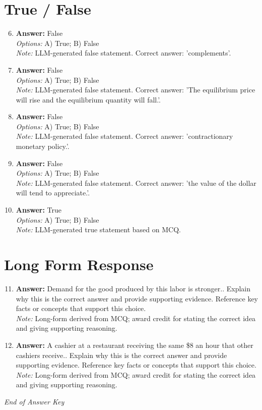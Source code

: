 \documentclass[12pt]{article}
\begin{document}
\section*{True / False}
\begin{enumerate}[label=\arabic*.]
\setcounter{enumi}{5}
\item \textbf{Answer:} False
\\ \textit{Options:} A) True; B) False
\\ \textit{Note:} LLM-generated false statement. Correct answer: 'complements'.
\item \textbf{Answer:} False
\\ \textit{Options:} A) True; B) False
\\ \textit{Note:} LLM-generated false statement. Correct answer: 'The equilibrium price will rise and the equilibrium quantity will fall.'.
\item \textbf{Answer:} False
\\ \textit{Options:} A) True; B) False
\\ \textit{Note:} LLM-generated false statement. Correct answer: 'contractionary monetary policy.'.
\item \textbf{Answer:} False
\\ \textit{Options:} A) True; B) False
\\ \textit{Note:} LLM-generated false statement. Correct answer: 'the value of the dollar will tend to appreciate.'.
\item \textbf{Answer:} True
\\ \textit{Options:} A) True; B) False
\\ \textit{Note:} LLM-generated true statement based on MCQ.
\end{enumerate}

\section*{Long Form Response}
\begin{enumerate}[label=\arabic*.]
\setcounter{enumi}{10}
\item \textbf{Answer:} Demand for the good produced by this labor is stronger.. Explain why this is the correct answer and provide supporting evidence. Reference key facts or concepts that support this choice.
\\ \textit{Note:} Long-form derived from MCQ; award credit for stating the correct idea and giving supporting reasoning.
\item \textbf{Answer:} A cashier at a restaurant receiving the same \$8 an hour that other cashiers receive.. Explain why this is the correct answer and provide supporting evidence. Reference key facts or concepts that support this choice.
\\ \textit{Note:} Long-form derived from MCQ; award credit for stating the correct idea and giving supporting reasoning.
\end{enumerate}

\vfill
\noindent\textit{End of Answer Key}
\end{document}
